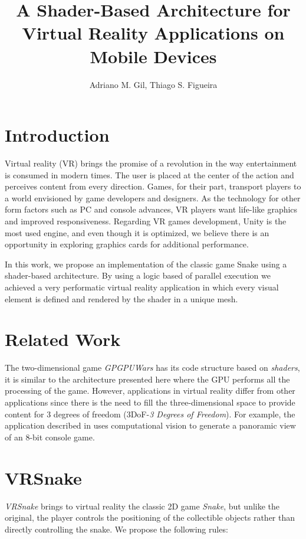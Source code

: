 \documentclass[12pt]{article}
\title{A Shader-Based Architecture for Virtual Reality Applications on Mobile Devices}
\author{Adriano M. Gil\inst{1}, Thiago S. Figueira\inst{1}}
\begin{document}
\maketitle

\smallskip

\section{Introduction}
Virtual reality (VR) brings the promise of a revolution in the way entertainment is consumed in modern times. The user is placed at the center of the action and perceives content from every direction. Games, for their part, transport players to a world envisioned by game developers and designers. As the technology for other form factors such as PC and console advances, VR players want life-like graphics and improved responsiveness. Regarding VR games development, Unity is the most used engine, and even though it is optimized, we believe there is an opportunity in exploring graphics cards for additional performance.

In this work, we propose an implementation of the classic game Snake using a shader-based architecture. By using a logic based of parallel execution we achieved a very performatic virtual reality application in which every visual element is defined and rendered by the shader in a unique mesh.

\section{Related Work}
The two-dimensional game \textit{GPGPUWars} \cite{joselli2009gpuwars} has its code structure based on \textit{shaders}, it is similar to the architecture presented here where the GPU performs all the processing of the game. However, applications in virtual reality differ from other applications since there is the need to fill the three-dimensional space to provide content for 3 degrees of freedom (3DoF-\textit{3 Degrees of Freedom}). For example, the application described in \cite{zund2015unfolding} uses computational vision to generate a panoramic view of an 8-bit console game.

\section{VRSnake} \label{sec:vrsnake}
\textit{VRSnake} brings to virtual reality the classic 2D game \textit{Snake}, but unlike the original, the player controls the positioning of the collectible objects rather than directly controlling the snake. We propose the following rules:
\end{document}
